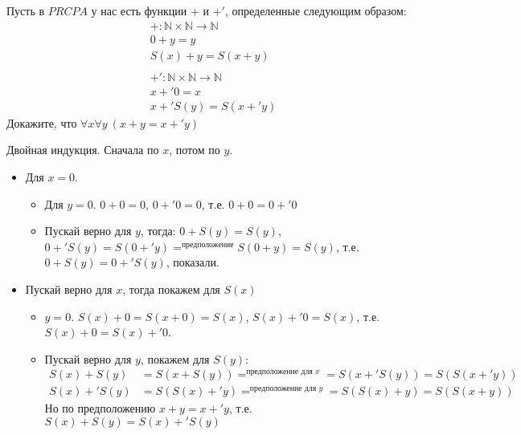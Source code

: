 \begin{task}[3]
	Пусть в $PRCPA$ у нас есть функции $+$ и $+'$, определенные следующим образом:
	\begin{align*}
	& + : \mathbb{N} \times \mathbb{N} \to \mathbb{N} \\
	& 0 + y = y \\
	& S(x) + y = S(x + y) \\
	& \\
	& +' : \mathbb{N} \times \mathbb{N} \to \mathbb{N} \\
	& x +' 0 = x \\
	& x +' S(y) = S(x +' y)
	\end{align*}
	Докажите, что $\forall x \forall y\ (x + y = x +' y)$
\end{task}
\begin{solution}
Двойная индукция. Сначала по $x$, потом по $y$.
\begin{itemize}
\item Для $x = 0$.
	\begin{itemize}
		\item Для $y = 0$. $0 + 0 = 0$, $0 +' 0 = 0$, т.е. $0 + 0 = 0 +' 0$
		\item Пускай верно для $y$, тогда: $0 + S(y) = S(y)$, $0 +' S(y) = S(0 +' y) =^{\text{предположение}} S(0 + y) = S(y)$, т.е. $0 + S(y) = 0 +' S(y)$, показали.
	\end{itemize}
\item Пускай верно для $x$, тогда покажем для $S(x)$
	\begin{itemize}
		\item $y = 0$. $S(x) + 0 = S(x + 0) = S(x)$, $S(x) +' 0 = S(x)$, т.е. $S(x) + 0 = S(x) +' 0$.
		\item Пускай верно для $y$, покажем для $S(y)$: 
		\begin{align*}
			S(x) + S(y) &= S(x + S(y)) =^{\text{предположение для $x$}} = S(x +' S(y)) = S(S(x +' y))\\
			S(x) +' S(y) &= S(S(x) +' y) =^{\text{предположение для $y$}} = S(S(x) + y) = S(S(x + y))
 		\end{align*}
 		Но по предположению $x + y = x +' y$, т.е. $S(x)+S(y) = S(x) +' S(y)$ \xqed
	\end{itemize}
\end{itemize}
\end{solution}


